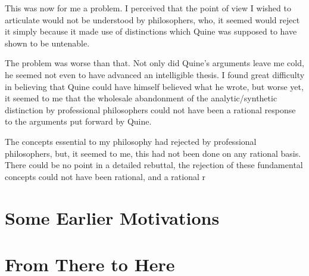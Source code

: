 This was now for me a problem.
I perceived that the point of view I wished to articulate would not be understood by philosophers, who, it seemed would reject it simply because it made use of distinctions which Quine was supposed to have shown to be untenable.

The problem was worse than that.
Not only did Quine's arguments leave me cold, he seemed not even to have advanced an intelligible thesis.
I found great difficulty in believing that Quine could have himself believed what he wrote, but worse yet, it seemed to me that the wholesale abandonment of the analytic/synthetic distinction by professional philosophers could not have been a rational response to the arguments put forward by Quine.

The concepts essential to my philosophy had rejected by professional philosophers, but, it seemed to me, this had not been done on any rational basis.
There could be no point in a detailed rebuttal, the rejection of these fundamental concepts could not have been rational, and a rational r

\section{Some Earlier Motivations}


\section{From There to Here}

